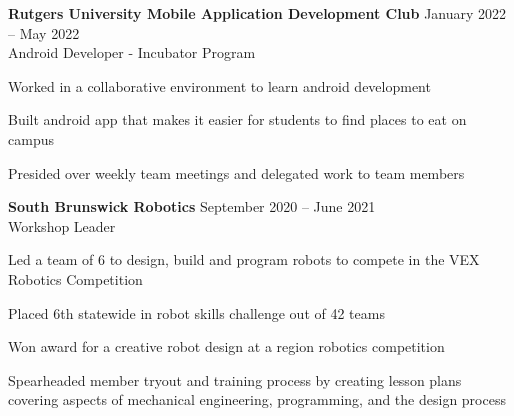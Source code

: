 \documentclass{article}
\newcommand{\employer}[4]{{
\vspace*{2pt}%
\textbf{#1} #2 \hfill #3\\ #4 \vspace*{2pt}}
}
\renewcommand{\labelitemii}{
$\vcenter{\hbox{\tiny$\bullet$}}$\hspace*{-3pt}
}
\newenvironment{bullet-list-minor}{
\begin{list}{\labelitemii}{\setlength\leftmargin{15pt} 
\topsep 0pt \itemsep -2pt}}{\vspace*{4pt}\end{list}
}
\begin{document}
    \employer{Rutgers University Mobile Application Development Club}
    {}{January 2022 -- May 2022}{Android Developer - Incubator Program}
	\begin{bullet-list-minor}
	\item Worked in a collaborative environment to learn android development
	\item Built android app that makes it easier for students to find places to eat on campus
	\item Presided over weekly team meetings and delegated work to team members
    \end{bullet-list-minor}
    
    \employer{South Brunswick Robotics}
    {}{September 2020 -- June 2021}{Workshop Leader}
	\begin{bullet-list-minor}
	\item Led a team of 6 to design, build and program robots to compete in the VEX Robotics Competition
    \item Placed 6th statewide in robot skills challenge out of 42 teams
    \item Won award for a creative robot design at a region robotics competition
    \item Spearheaded member tryout and training process by creating lesson plans covering aspects of mechanical engineering, programming, and the design process
    \end{bullet-list-minor}
\end{document}
